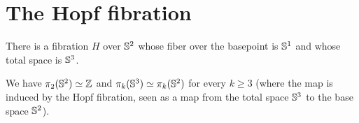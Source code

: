 \documentclass[hott-all.tex]{subfiles}
\begin{document}
\section{The Hopf fibration}
% 
% 
\begin{thm}
There is a fibration $H$ over $\mathbb{S} ^2$ whose fiber over the basepoint is $\mathbb{S} ^1$ and
whose total space is $\mathbb{S} ^3$.
\end{thm}
% 
%
%
%
%
% 
\begin{cor} 
  We have $\pi_2(\mathbb{S}^2) \simeq \mathbb{Z}$ and $\pi_k(\mathbb{S}^3) \simeq \pi_k(\mathbb{S}^2)$ for
  every $k\ge3$ (where the map is induced by the Hopf fibration, seen as a map
  from the total space $\mathbb{S}^3$ to the base space $\mathbb{S}^2$).
\end{cor}
% 
% 
\end{document}
